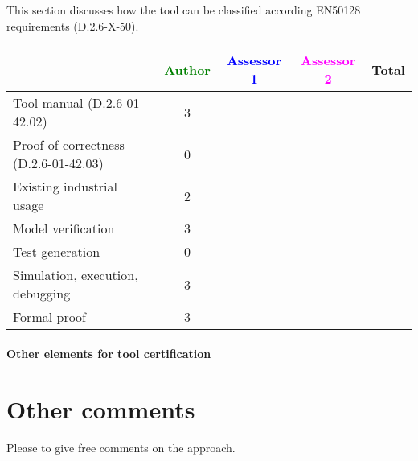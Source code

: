 This section discusses how the tool can be classified according EN50128 requirements (D.2.6-X-50).


\begin{tabular}{|l | c | c | c | c|}
\hline
& \textcolor{green}{Author} & \textcolor{blue}{Assessor 1} & \textcolor{magenta}{Assessor 2} & Total \\
\hline 
Tool manual (D.2.6-01-42.02) & 3 & & &  \\
\hline
Proof of correctness (D.2.6-01-42.03)   & 0 & & & \\
\hline
Existing industrial  usage  & 2 & & & \\
\hline
Model verification & 3 & & & \\
\hline
Test generation & 0 & & & \\
\hline
Simulation, execution, debugging & 3 & & & \\
\hline
Formal proof &3  & & & \\
\hline
\end{tabular}

\paragraph{Other elements for tool certification}

\section{Other comments}
Please to  give free comments on the approach.



